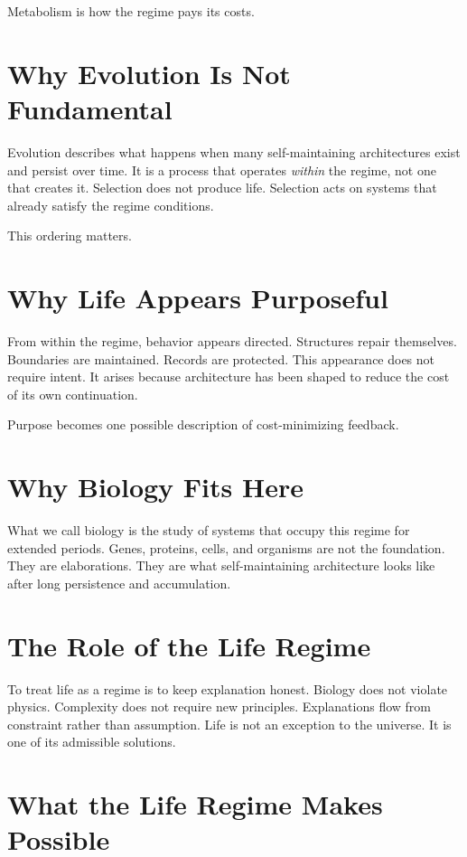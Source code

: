 \documentclass[11pt,twoside,openright]{book}
\begin{document}
Metabolism is how the regime pays its costs.

\section*{Why Evolution Is Not Fundamental}

Evolution describes what happens when many self-maintaining architectures exist and persist over time. It is a process that operates \emph{within} the regime, not one that creates it. Selection does not produce life. Selection acts on systems that already satisfy the regime conditions.

This ordering matters.

\section*{Why Life Appears Purposeful}

From within the regime, behavior appears directed. Structures repair themselves. Boundaries are maintained. Records are protected. This appearance does not require intent. It arises because architecture has been shaped to reduce the cost of its own continuation.

Purpose becomes one possible description of cost-minimizing feedback.

\section*{Why Biology Fits Here}

What we call biology is the study of systems that occupy this regime for extended periods. Genes, proteins, cells, and organisms are not the foundation. They are elaborations. They are what self-maintaining architecture looks like after long persistence and accumulation.

\section*{The Role of the Life Regime}

To treat life as a regime is to keep explanation honest. Biology does not violate physics. Complexity does not require new principles. Explanations flow from constraint rather than assumption. Life is not an exception to the universe. It is one of its admissible solutions.

\section*{What the Life Regime Makes Possible}
\end{document}
